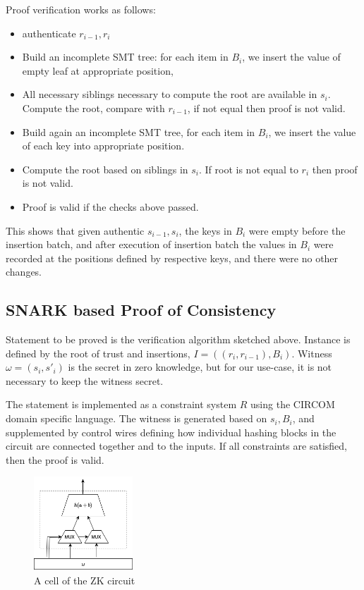 \documentclass{article}
\begin{document}
Proof verification works as follows:
\begin{itemize}
    \item authenticate $r_{i-1}, r_i$
    \item Build an incomplete SMT tree: for each item in $B_i$, we insert the value of empty leaf at appropriate position,
    \item All necessary siblings necessary to compute the root are available in $s_i$. Compute the root, compare with $r_{i-1}$, if not equal then proof is not valid.
    \item Build again an incomplete SMT tree, for each item in $B_i$, we insert the value of each key into appropriate position.
    \item Compute the root based on siblings in $s_i$. If root is not equal to $r_i$ then proof is not valid.
    \item Proof is valid if the checks above passed.
\end{itemize}

This shows that given authentic $s_{i-1}, s_i$, the keys in $B_i$ were empty before the insertion batch, and after execution of insertion batch the values in $B_i$ were recorded at the positions defined by respective keys, and there were no other changes.


\subsection{SNARK based Proof of Consistency}

Statement to be proved is the verification algorithm sketched above. Instance is defined by the root of trust and insertions, $I = ((r_i, r_{i-1}),B_i)$. Witness $\omega = (s_i, s'_i)$ is the secret in zero knowledge, but for our use-case, it is not necessary to keep the witness secret.

The statement is implemented as a constraint system $R$ using the CIRCOM domain specific language. The witness is generated based on $s_i, B_i$, and supplemented by control wires defining how individual hashing blocks in the circuit are connected together and to the inputs. If all constraints are satisfied, then the proof is valid.

\begin{figure}[htb]
    \centering
    \includegraphics[width=0.33\textwidth]{smt-circuit-cell.drawio}
    \caption{A cell of the ZK circuit}
    \label{fig:zk-circuit-cell}
\end{figure}
\end{document}

